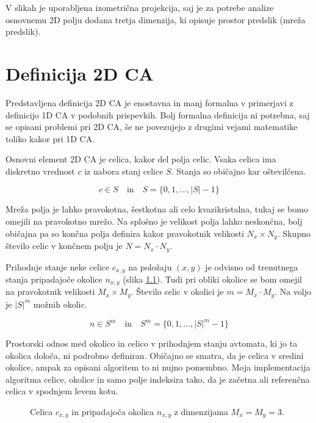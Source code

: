 \documentclass[12pt,a4paper,openany,twoside]{book}
\begin{document}
V slikah je uporabljena izometrična projekcija,
saj je za potrebe analize osnovnemu 2D polju dodana tretja dimenzija,
ki opisuje prostor predslik (mreža predslik).

\chapter{Definicija 2D CA}

Predstavljena definicija 2D CA je enostavna in manj formalna
v primerjavi z definicijo 1D CA v podobnih prispevkih.
Bolj formalna definicija ni potrebna, saj se opisani problemi pri 2D CA,
še ne povezujejo z drugimi vejami matematike toliko kakor pri 1D CA.

Osnovni element 2D CA je celica, kakor del polja celic.
Vsaka celica ima diskretno vrednost \(c\) iz nabora stanj celice \(S\).
Stanja so običajno kar oštevilčena.

\begin{equation}
c \in S
\quad \textrm{in} \quad
S = \{ 0, 1, \dots, {\lvert S \rvert} -1 \}
\end{equation}

Mreža polja je lahko pravokotna, šestkotna ali celo kvazikristalna, tukaj se
bomo omejili na pravokotno mrežo. Na splošno je velikost polja lahko neskončna,
bolj običajna pa so končna polja definira kakor pravokotnik velikosti \(N_x \times N_y\).
Skupno število celic v končnem polju je \(N=N_x \cdot N_y\).

Prihodnje stanje neke celice \(c_{x,y}\) na položaju \((x,y)\)
je odvisno od trenutnega stanja pripadajoče okolice \(n_{x,y}\) (slika \ref{neighborhood}).
Tudi pri obliki okolice se bom omejil na pravokotnik velikosti \(M_x \times M_y\).
Število celic v okolici je \(m=M_x \cdot M_y\).
Na voljo je \({\lvert S \rvert}^m\) možnih okolic.

\begin{equation}
n \in S^m
\quad \textrm{in} \quad
S^m = \{ 0, 1, \dots, {\lvert S \rvert}^m -1 \}
\end{equation}

Prostorski odnos med okolico in celico v prihodnjem stanju avtomata, ki jo ta okolica določa,
ni podrobno definiran. Običajno se smatra, da je celica v sredini okolice, ampak za opisani algoritem to ni
nujno pomembno. Moja implementacija algoritma celice, okolice in samo polje indeksira tako,
da je začetna ali referenčna celica v spodnjem levem kotu.

\begin{figure}[htb]
\centerline{}
\caption[Velikost okolice.]{Celica \(c_{x,y}\) in pripadajoča okolica \(n_{x,y}\) z dimenzijama \(M_x=M_y=3\).}
\label{neighborhood}
\end{figure}
\end{document}
